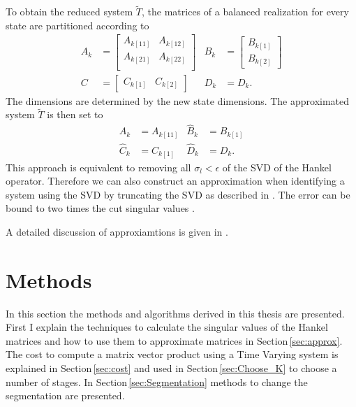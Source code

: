 \documentclass[doctype=mastersthesis,BCOR=15mm,biblatex]{ldvbook}%
\begin{document}
To obtain the reduced system $\tilde{T}$, the matrices of a balanced realization for every state are partitioned according to
\begin{subequations}\label{eq:segmented_system}
\begin{align}
	A_k &=\begin{bmatrix}
	A_{k[11]} & A_{k[12]} \\
	A_{k[21]} & A_{k[22]} \\
	\end{bmatrix}
	&
	B_k &= \begin{bmatrix}
	B_{k[1]} \\ B_{k[2]}
	\end{bmatrix} 
	\\
	C &= \begin{bmatrix}
	C_{k[1]} & C_{k[2]}
	\end{bmatrix}& 
	D_k&=D_k.
\end{align}
\end{subequations}
The dimensions are determined by the new state dimensions.
The approximated system $\tilde{T}$ is then set to
\begin{subequations}
\begin{align}\label{eq:reduced_system}
	\hat{A}_k &= A_{k[11]}  & \hat{B}_k &= B_{k[1]}\\
	\hat{C}_k &=C_{k[1]}      & \hat{D}_k &= D_k.
\end{align}
\end{subequations}
This approach is equivalent to removing all $\sigma_l<\epsilon$ of the SVD of the Hankel operator.
Therefore we can also construct an approximation when identifying a system using the SVD by truncating the SVD as described in \cite{shokoohi_identification_1987}.
The error can be bound to two times the cut singular values \cite{lall_error-bounds_2003}.

A detailed discussion of approxiamtions is given in
\cite{antoulas_approximation_2005}.

\chapter{Methods}\label{chap:methods}
In this section the methods and algorithms derived in this thesis are presented.
First I explain the techniques to calculate the singular values of the Hankel matrices and how to use them to approximate matrices in Section\,\ref{sec:approx}.
The cost to compute a matrix vector product using a Time Varying system is explained in Section\,\ref{sec:cost} and used in Section\,\ref{sec:Choose_K} to choose a number of stages. 
In Section\,\ref{sec:Segmentation} methods to change the segmentation are presented.
\end{document}
